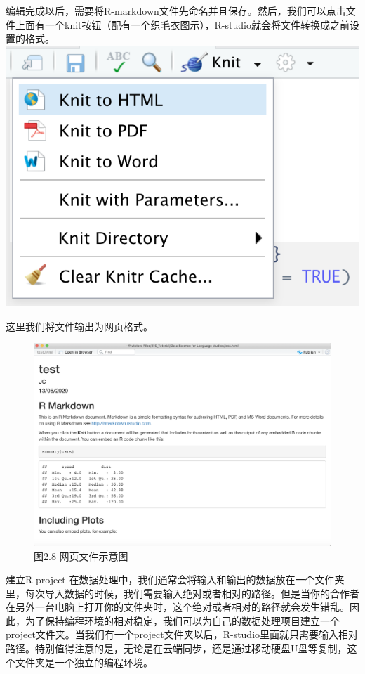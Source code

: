 \documentclass[]{book}
\begin{document}
编辑完成以后，需要将R-markdown文件先命名并且保存。然后，我们可以点击文件上面有一个knit按钮（配有一个织毛衣图示），R-studio就会将文件转换成之前设置的格式。
\includegraphics{images/2.7.png}

这里我们将文件输出为网页格式。

\begin{figure}
\centering
\includegraphics{images/2.8.png}
\caption{图2.8 网页文件示意图}
\end{figure}

建立R-project
在数据处理中，我们通常会将输入和输出的数据放在一个文件夹里，每次导入数据的时候，我们需要输入绝对或者相对的路径。但是当你的合作者在另外一台电脑上打开你的文件夹时，这个绝对或者相对的路径就会发生错乱。因此，为了保持编程环境的相对稳定，我们可以为自己的数据处理项目建立一个project文件夹。当我们有一个project文件夹以后，R-studio里面就只需要输入相对路径。特别值得注意的是，无论是在云端同步，还是通过移动硬盘U盘等复制，这个文件夹是一个独立的编程环境。
\end{document}
